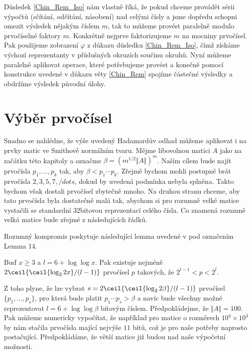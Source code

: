 Důsledek \ref{Chin_Rem_Iso} nám vlastně říká, že pokud chceme provádět sérii
výpočtů (sčítání, odčítání, násobení) nad celými čísly a jsme dopředu schopni
omezit výsledek nějakým číslem $ m $, tak to můžeme provést paralelně modulo
prvočíselné faktory $ m $. Konkrétně nejprve faktorizujeme $ m $ na mocniny
prvočísel. Pak použijeme zobrazení $ \varphi $ z důkazu důsledku \ref{Chin_Rem_Iso},
čímž získáme výchozí reprezentanty v příslušných okruzích součinu okruhů.
Nyní můžeme paralelně aplikovat operace, které potřebujeme provést a konečně
pomocí konstrukce uvedené v důkazu věty \ref{Chin_Rem} spojíme částečné výsledky
a obdržíme výsledek původní úlohy.


\section{Výběr prvočísel}
Snadno se nahlédne, že výše uvedený Hadamardův odhad můžeme aplikovat i na prvky
matic ve Smithově normálním tvaru. Mějme libovolnou matici $ A $ jako na začátku
této kapitoly a označme $ \beta = (m^{1/2} \Vert A \Vert )^m $. Naším cílem bude
najít prvočísla $ p_1,\dots, p_k $ tak, aby $ \beta < p_1 \cdots p_k $. Zřejmě
bychom mohli postupně brát prvočísla $ 2, 3, 5, 7, /dots $, dokud by uvedená
podmínka nebyla splněna. Takto bychom však dostali prvočísel zbytečně mnoho. Na
druhou stranu chceme, aby tato prvočísla byla dostatečně malá tak, abychom
si pro rozumně velké matice vystačili se standardní 32bitovou reprezentací
celého čísla. Co znamená rozumně velká matice bude zřejmé z následujících řádků.

Rozumný kompromis poskytuje následující lemma uvedené v \cite{triang} pod
označením Lemma 14.

\begin{lem} \label{num_prim}
Buď $ x \geq 3 $ a $ l = 6 + \log \log x $. Pak existuje nejméně
$ 2 \ceil{\ceil{\log_2{2 x}} / (l - 1)} $ prvočísel $ p $ takových, že
$ 2^{l - 1} < p < 2^l $.
\end{lem}

Z toho plyne, že lze vybrat
$ s = 2 \ceil{\ceil{\log_2{2 \beta }} / (l - 1)} $ prvočísel
$ \{ p_1, \dots, p_s \} $, pro která bude platit $ p_1 \cdots p_s > \beta $ a
navíc bude všechny možné reprezentovat $ l = 6 + \log \log \beta $ bitovým
číslem. Předpokládejme, že $ \Vert A \Vert = 100 $. Pak můžeme numericky
vypočítat, že například pro matice o rozměrech $ 10^4 \times 10^4 $ by
nám stačila prvočísla mající nejvýše $ 11 $ bitů, což je pro naše potřeby naprosto
postačující. Předpokládáme, že větší matice již budou nad naše výpočetní
možnosti.

